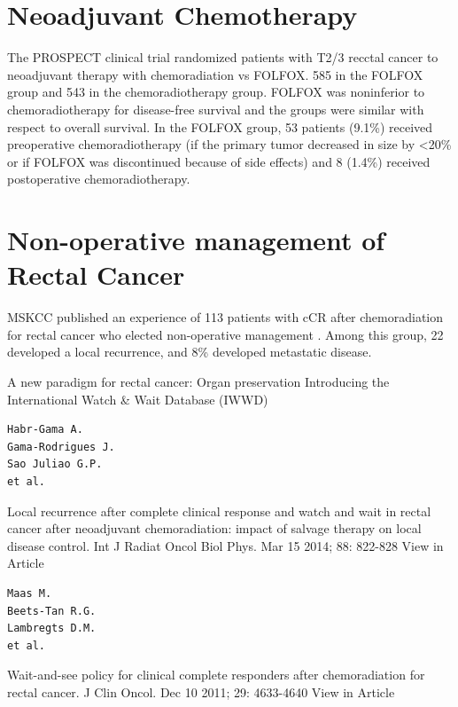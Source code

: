 \documentclass[
]{book}
\begin{document}
\hypertarget{neoadjuvant-chemotherapy-1}{%
\chapter{Neoadjuvant Chemotherapy}\label{neoadjuvant-chemotherapy-1}}

The PROSPECT clinical trial \citep{schrag322} randomized patients with T2/3 recctal cancer to neoadjuvant therapy with chemoradiation vs FOLFOX. 585 in the FOLFOX group and 543 in the chemoradiotherapy group. FOLFOX was noninferior to chemoradiotherapy for disease-free survival and the groups were similar with respect to overall survival. In the FOLFOX group, 53 patients (9.1\%) received preoperative chemoradiotherapy (if the primary tumor decreased in size by \textless20\% or if FOLFOX was discontinued because of side effects) and 8 (1.4\%) received postoperative chemoradiotherapy.

\hypertarget{non-operative-management-of-rectal-cancer}{%
\chapter{Non-operative management of Rectal Cancer}\label{non-operative-management-of-rectal-cancer}}

MSKCC published an experience of 113 patients with cCR after chemoradiation for rectal cancer who elected non-operative management \citep{smithe185896}. Among this group, 22 developed a local recurrence, and 8\% developed metastatic disease.\citep{smith657}

A new paradigm for rectal cancer: Organ preservation
Introducing the International Watch \& Wait Database (IWWD) \citep{beets1562}

\begin{verbatim}
Habr-Gama A.
Gama-Rodrigues J.
Sao Juliao G.P.
et al.
\end{verbatim}

Local recurrence after complete clinical response and watch and wait in rectal cancer after neoadjuvant chemoradiation: impact of salvage therapy on local disease control.
Int J Radiat Oncol Biol Phys. Mar 15 2014; 88: 822-828
View in Article

\begin{verbatim}
Maas M.
Beets-Tan R.G.
Lambregts D.M.
et al.
\end{verbatim}

Wait-and-see policy for clinical complete responders after chemoradiation for rectal cancer.
J Clin Oncol. Dec 10 2011; 29: 4633-4640
View in Article
\end{document}
